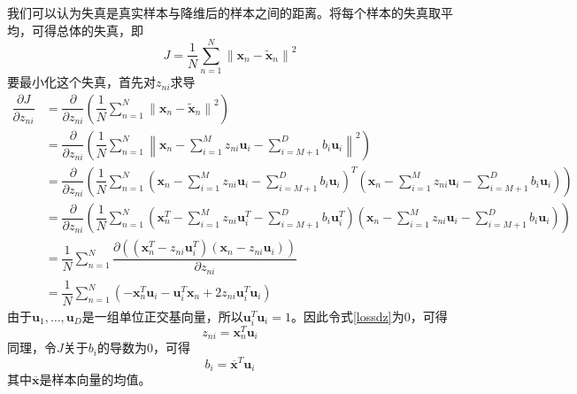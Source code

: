 我们可以认为失真是真实样本与降维后的样本之间的距离。将每个样本的失真取平均，可得总体的失真，即
\begin{equation}
    J=\dfrac{1}{N}\sum^N_{n=1}\left\lVert \mathbf{x}_n-\tilde{\mathbf{x}}_n\right\rVert ^2
    \label{loss}
\end{equation}
要最小化这个失真，首先对$z_{ni}$求导
\begin{align}
    \dfrac{\partial J}{\partial z_{ni}}
    \label{lossdz}
    &= \dfrac{\partial}{\partial z_{ni}}\left(\dfrac{1}{N}\sum^N_{n=1}\left\lVert \mathbf{x}_n-\tilde{\mathbf{x}}_n\right\rVert ^2\right) \\
    &= \dfrac{\partial}{\partial z_{ni}}\left(\dfrac{1}{N}\sum^N_{n=1}\left\lVert \mathbf{x}_n-\sum^M_{i=1}z_{ni}\mathbf{u}_i-\sum^D_{i=M+1}b_i\mathbf{u}_i\right\rVert ^2\right) \\
    &= \dfrac{\partial}{\partial z_{ni}}\left(\dfrac{1}{N}\sum^N_{n=1}\left(\mathbf{x}_n-\sum^M_{i=1}z_{ni}\mathbf{u}_i-\sum^D_{i=M+1}b_i\mathbf{u}_i\right)^T\left(\mathbf{x}_n-\sum^M_{i=1}z_{ni}\mathbf{u}_i-\sum^D_{i=M+1}b_i\mathbf{u}_i\right)\right) \\
    &= \dfrac{\partial}{\partial z_{ni}}\left(\dfrac{1}{N}\sum^N_{n=1}\left(\mathbf{x}^T_n-\sum^M_{i=1}z_{ni}\mathbf{u}^T_i-\sum^D_{i=M+1}b_i\mathbf{u}^T_i\right)\left(\mathbf{x}_n-\sum^M_{i=1}z_{ni}\mathbf{u}_i-\sum^D_{i=M+1}b_i\mathbf{u}_i\right)\right) \\
    &= \dfrac{1}{N}\sum^N_{n=1}\dfrac{\partial\left(\left(\mathbf{x}^T_n-z_{ni}\mathbf{u}^T_i\right)\left(\mathbf{x}_n-z_{ni}\mathbf{u}_i\right)\right)}{\partial z_{ni}} \\
    &= \dfrac{1}{N}\sum^N_{n=1}\left(-\mathbf{x}^T_n\mathbf{u}_i-\mathbf{u}^T_i\mathbf{x}_n+2z_{ni}\mathbf{u}^T_i\mathbf{u}_i\right)
\end{align}
由于$\mathbf{u}_1, \ldots, \mathbf{u}_D$是一组单位正交基向量，所以$\mathbf{u}^T_i\mathbf{u}_i=1$。因此令式\ref{lossdz}为$0$，可得
\begin{equation}
    z_{ni}=\mathbf{x}^T_n\mathbf{u}_i
    \label{z}
\end{equation}
同理，令$J$关于$b_i$的导数为$0$，可得
\begin{equation}
    b_i=\overline{\mathbf{x}}^T\mathbf{u}_i
    \label{b}
\end{equation}
其中$\overline{\mathbf{x}}$是样本向量的均值。

